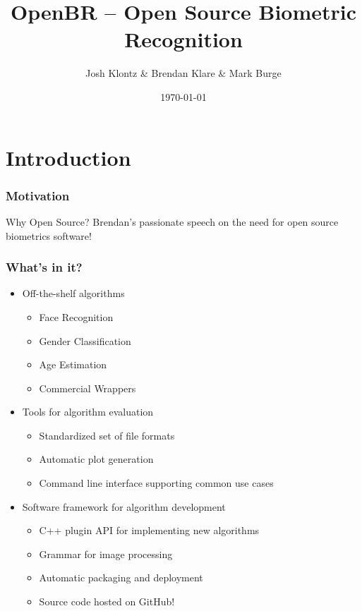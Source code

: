 \documentclass[12pt]{beamer}
\title[OpenBR]{OpenBR -- Open Source Biometric Recognition}
\author[J. Klontz \& B. Klare \& M. Burge]{Josh Klontz \& Brendan Klare \& Mark Burge}
\institute[]
{
www.openbiometrics.org \\
\medskip
{\emph{openbr-dev@googlegroups.com}}
}
\date{\today}
\begin{document}
\begin{frame}
\titlepage
\end{frame}

\section{Introduction}
\begin{frame}
\frametitle{Motivation}
\begin{block}
{Why Open Source?}
Brendan's passionate speech on the need for open source biometrics software!
\end{block}
\end{frame}

\begin{frame}
\frametitle{What's in it?}
\begin{itemize}
\item Off-the-shelf algorithms
  \begin{itemize}
  \item Face Recognition
  \item Gender Classification
  \item Age Estimation
  \item Commercial Wrappers
  \end{itemize}
\pause
\item Tools for algorithm evaluation
  \begin{itemize}
  \item Standardized set of file formats
  \item Automatic plot generation
  \item Command line interface supporting common use cases
  \end{itemize}
\pause
\item Software framework for algorithm development
  \begin{itemize}
  \item C++ plugin API for implementing new algorithms
  \item Grammar for image processing
  \item Automatic packaging and deployment
  \item Source code hosted on GitHub!
  \end{itemize}
\end{itemize}
\end{frame}

\newcommand{\graphicblock}[3]
{
  \begin{block}{#1}
    \begin{columns}
      \column{0.1\textwidth}
        \texttt{[image: \#2]}
      \column{0.9\textwidth}
        #3
    \end{columns}
  \end{block}
}
\end{document}
